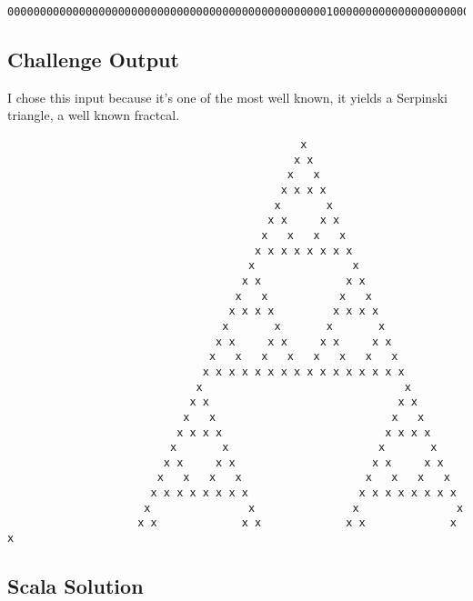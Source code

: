 \begin{verbatim}
00000000000000000000000000000000000000000000000001000000000000000000000000000000000000000000000000
\end{verbatim}

\subsection{Challenge Output}\label{challenge-output-2}

I chose this input because it's one of the most well known, it yields a
Serpinski triangle, a well known fractcal.

\begin{verbatim}
                                             x
                                            x x
                                           x   x
                                          x x x x
                                         x       x
                                        x x     x x
                                       x   x   x   x
                                      x x x x x x x x
                                     x               x
                                    x x             x x
                                   x   x           x   x
                                  x x x x         x x x x
                                 x       x       x       x
                                x x     x x     x x     x x
                               x   x   x   x   x   x   x   x
                              x x x x x x x x x x x x x x x x
                             x                               x
                            x x                             x x
                           x   x                           x   x
                          x x x x                         x x x x
                         x       x                       x       x
                        x x     x x                     x x     x x
                       x   x   x   x                   x   x   x   x
                      x x x x x x x x                 x x x x x x x x
                     x               x               x               x
                    x x             x x             x x             x x
\end{verbatim}

\subsection{Scala Solution}\label{scala-solution-3}

